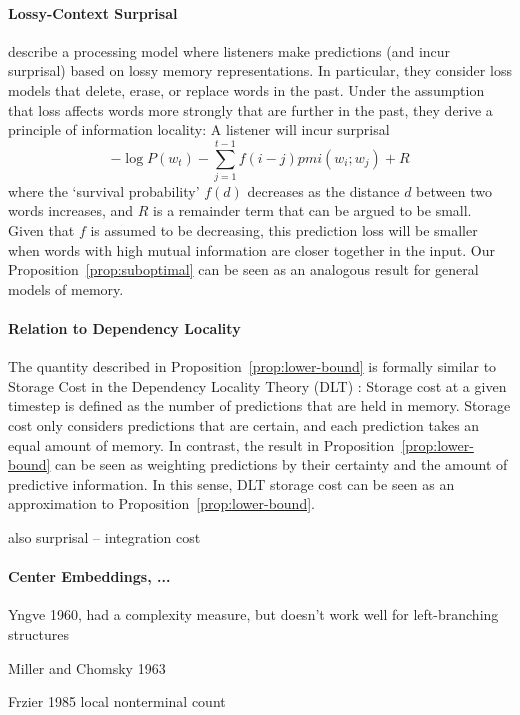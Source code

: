 \documentclass[11pt,letterpaper]{article}
\begin{document}
\paragraph{Lossy-Context Surprisal}
\citet{futrell-noisy-context-2017} describe a processing model where listeners make predictions (and incur surprisal) based on lossy memory representations.
In particular, they consider loss models that delete, erase, or replace words in the past.
Under the assumption that loss affects words more strongly that are further in the past, they derive a principle of information locality:
A listener will incur surprisal
$$ -\log P(w_t) - \sum_{j=1}^{t-1} f(i-j) pmi(w_i; w_j) + R$$
where the `survival probability' $f(d)$ decreases as the distance $d$ between two words increases, and $R$ is a remainder term that can be argued to be small.
Given that $f$ is assumed to be decreasing, this prediction loss will be smaller when words with high mutual information are closer together in the input.
Our Proposition~\ref{prop:suboptimal} can be seen as an analogous result for general models of memory.






\paragraph{Relation to Dependency Locality}
The quantity described in Proposition~\ref{prop:lower-bound} is formally similar to Storage Cost in the Dependency Locality Theory (DLT) \citep{gibson-linguistic-1998}: Storage cost at a given timestep is defined as the number of predictions that are held in memory.
Storage cost only considers predictions that are certain, and each prediction takes an equal amount of memory.
In contrast, the result in Proposition~\ref{prop:lower-bound} can be seen as weighting predictions by their certainty and the amount of predictive information.
In this sense, DLT storage cost can be seen as an approximation to Proposition~\ref{prop:lower-bound}.

also surprisal -- integration cost


\paragraph{Center Embeddings, ...}
Yngve 1960, had a complexity measure, but doesn't work well for left-branching structures

Miller and Chomsky 1963

Frzier 1985 local nonterminal count
\end{document}
